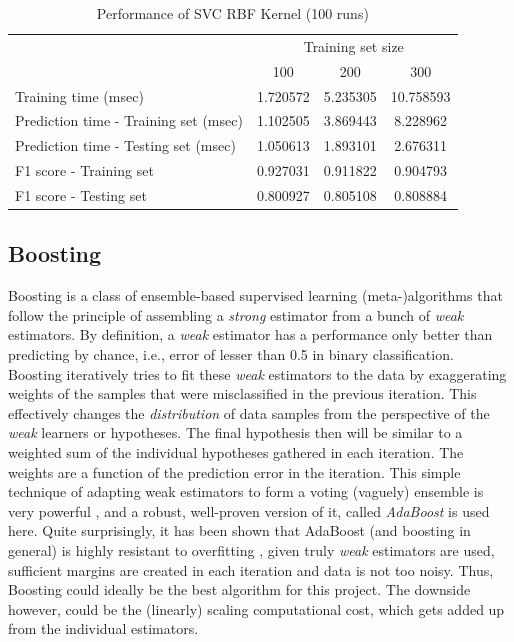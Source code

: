 \documentclass{article}
\begin{document}
	\begin{table}[!ht]
		\centering
		\begin{tabular}{l|ccc}
			\toprule
			{} & \multicolumn{3}{c}{Training set size} \\
			{} &       100 &       200 &       300 \\
			\midrule
			Training time (msec)                  &  1.720572 &  5.235305 &  10.758593 \\
			Prediction time - Training set (msec) &  1.102505 &  3.869443 &   8.228962 \\
			Prediction time - Testing set (msec)  &  1.050613 &  1.893101 &   2.676311 \\
			F1 score - Training set               &  0.927031 &  0.911822 &   0.904793 \\
			F1 score - Testing set                &  0.800927 &  0.805108 &   0.808884 \\
			\bottomrule
		\end{tabular}
		\caption{Performance of SVC RBF Kernel (100 runs)}
		\label{tab:svc_rbf_100}
	\end{table}
	
	\subsection{Boosting}
	
	Boosting is a class of ensemble-based supervised learning (meta-)algorithms that follow the principle of assembling a \emph{strong} estimator from a bunch of \emph{weak} estimators. By definition, a \emph{weak} estimator has a performance only better than predicting by chance, i.e., error of lesser than 0.5 in binary classification. Boosting iteratively tries to fit these \emph{weak} estimators to the data by exaggerating weights of the samples that were misclassified in the previous iteration. This effectively changes the \emph{distribution} of data samples from the perspective of the \emph{weak} learners or hypotheses. The final hypothesis then will be similar to a weighted sum of the individual hypotheses gathered in each iteration. The weights are a function of the prediction error in the iteration. This simple technique of adapting weak estimators to form a voting (vaguely) ensemble is very powerful \cite{shapire1990}, and a robust, well-proven version of it, called \emph{AdaBoost} \cite{Freund1997} is used here. Quite surprisingly, it has been shown that AdaBoost (and boosting in general) is highly resistant to overfitting \cite{Schapire2013}, given truly \emph{weak} estimators are used, sufficient margins are created in each iteration and data is not too noisy. Thus, Boosting could ideally be the best algorithm for this project. The downside however, could be the (linearly) scaling computational cost, which gets added up from the individual estimators.
	
\end{document}
